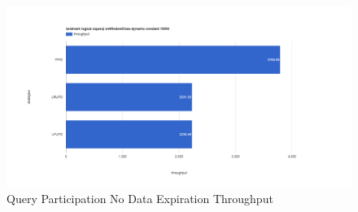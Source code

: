 \begin{figure}[!htbp]
	\centering
    \includegraphics[width=6.5in]{img/app3-qp-no-t.png}
    \caption{Query Participation No Data Expiration Throughput}
\end{figure}